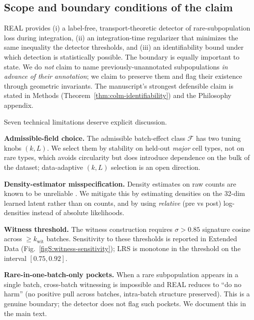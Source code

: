 
\subsection*{Scope and boundary conditions of the claim}

REAL provides (i) a label-free, transport-theoretic detector of rare-subpopulation loss during integration, (ii) an integration-time regularizer that minimizes the same inequality the detector thresholds, and (iii) an identifiability bound under which detection is statistically possible. The boundary is equally important to state. We do \emph{not} claim to name previously-unannotated subpopulations \emph{in advance of their annotation}; we claim to preserve them and flag their existence through geometric invariants. The manuscript's strongest defensible claim is stated in Methods (Theorem~\ref{thm:colm-identifiability}) and the Philosophy appendix.

Seven technical limitations deserve explicit discussion.

\textbf{Admissible-field choice.} The admissible batch-effect class $\mathcal{F}$ has two tuning knobs $(k, L)$. We select them by stability on held-out \emph{major} cell types, not on rare types, which avoids circularity but does introduce dependence on the bulk of the dataset; data-adaptive $(k, L)$ selection is an open direction.

\textbf{Density-estimator misspecification.} Density estimates on raw counts are known to be unreliable \citep{nalisnick2019knowdontknow}. We mitigate this by estimating densities on the 32-dim learned latent rather than on counts, and by using \emph{relative} (pre vs post) log-densities instead of absolute likelihoods.

\textbf{Witness threshold.} The witness construction requires $\sigma > 0.85$ signature cosine across $\ge k_\text{wit}$ batches. Sensitivity to these thresholds is reported in Extended Data (Fig.~\ref{figS:witness-sensitivity}); LRS is monotone in the threshold on the interval $[0.75, 0.92]$.

\textbf{Rare-in-one-batch-only pockets.} When a rare subpopulation appears in a single batch, cross-batch witnessing is impossible and REAL reduces to ``do no harm'' (no positive pull across batches, intra-batch structure preserved). This is a genuine boundary; the detector does not flag such pockets. We document this in the main text.

